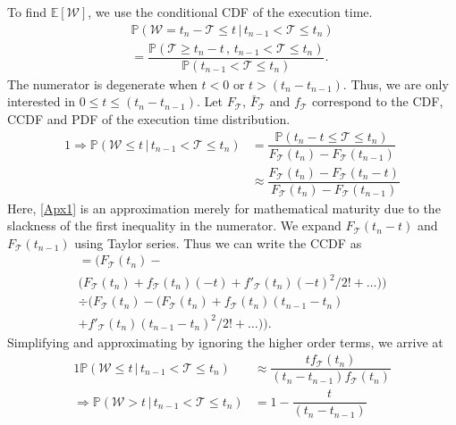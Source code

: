 To find
$\mathbb{E}[\mathcal{W}]$, we use the conditional \gls{CDF} of the execution time.
\begin{multline*}
    \mathbb{P}(\mathcal{W}=t_n-\mathcal{T}\leq t\,\big\vert\,t_{n-1}<\mathcal{T}\leq t_n)\\=\dfrac{\mathbb{P}(\mathcal{T}\geq t_n-t\,,\,t_{n-1}<\mathcal{T}\leq t_n)}{\mathbb{P}(t_{n-1}<\mathcal{T}\leq t_n)}.
\end{multline*}
The numerator is degenerate when $t\!<\!0$ or $t\!>\!(t_n\!-\!t_{n-1})$.
Thus, we are only interested in $0\!\leq\!t\!\leq\! (t_n-t_{n-1})$.
Let $F_{\mathcal{T}}$, $\bar{F}_{\mathcal{T}}$ and $f_{\mathcal{T}}$ correspond to the \gls{CDF}, \gls{CCDF} and \gls{PDF} of the execution time distribution.
\begin{alignat}{1}
    \!\!\!\Rightarrow\mathbb{P}(\mathcal{W}\leq t\,\big\vert\,t_{n-1}<\mathcal{T}\leq t_n)&=\dfrac{\mathbb{P}(t_n-t\leq\mathcal{T}\leq t_n)}{F_\mathcal{T}(t_n)-F_\mathcal{T}(t_{n-1})}\nonumber\\
    &\approx\dfrac{F_\mathcal{T}(t_n)-F_\mathcal{T}(t_{n}-t)}{F_\mathcal{T}(t_n)-F_\mathcal{T}(t_{n-1})}\label{Apx1}
\end{alignat}
Here, \cref{Apx1} is an approximation merely for mathematical maturity due to the slackness of the first inequality in the numerator.
We expand $F_\mathcal{T}(t_{n}-t)$ and $F_\mathcal{T}(t_{n-1})$ using Taylor series. Thus we can write the \gls{CCDF} as
\begin{multline*}
    =\Big(F_\mathcal{T}(t_n)-\\\big(F_\mathcal{T}(t_n)+f_\mathcal{T}(t_n)(-t)+f'_\mathcal{T}(t_n)(-t)^2/2!+\dots\big)\Big)\\
    \div \Big(F_\mathcal{T}(t_n)-\big(F_\mathcal{T}(t_n)+f_\mathcal{T}(t_n)(t_{n-1}-t_n)\\+f'_\mathcal{T}(t_n)(t_{n-1}-t_n)^2/2!+\dots\big)\Big).
\end{multline*}
Simplifying and approximating by ignoring the higher order terms, we arrive at
\begin{alignat}{1}
    \mathbb{P}(\mathcal{W}\leq t\,\big\vert\,t_{n-1}<\mathcal{T}\leq t_n)&\approx\dfrac{tf_\mathcal{T}(t_n)}{(t_{n}-t_{n-1})f_\mathcal{T}(t_n)}\label{Apx2}\\
    \Rightarrow\mathbb{P}(\mathcal{W}> t\,|\,t_{n-1}<\mathcal{T}\leq t_n)&= 1-\dfrac{t}{(t_{n}-t_{n-1})}\nonumber
\end{alignat}

